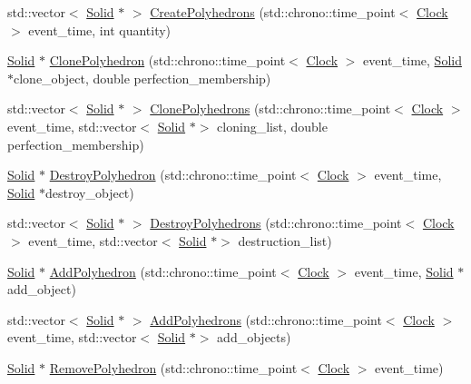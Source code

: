 \begin{DoxyCompactItemize}
std\+::vector$<$ \hyperlink{class_solid}{Solid} $\ast$ $>$ \hyperlink{class_solid_a40b2ea07e384aff138ba139c3c84f525}{Create\+Polyhedrons} (std\+::chrono\+::time\+\_\+point$<$ \hyperlink{universe_8h_a0ef8d951d1ca5ab3cfaf7ab4c7a6fd80}{Clock} $>$ event\+\_\+time, int quantity)
\item 
\hyperlink{class_solid}{Solid} $\ast$ \hyperlink{class_solid_ae83094e9c002a7574db242ed0bff6288}{Clone\+Polyhedron} (std\+::chrono\+::time\+\_\+point$<$ \hyperlink{universe_8h_a0ef8d951d1ca5ab3cfaf7ab4c7a6fd80}{Clock} $>$ event\+\_\+time, \hyperlink{class_solid}{Solid} $\ast$clone\+\_\+object, double perfection\+\_\+membership)
\item 
std\+::vector$<$ \hyperlink{class_solid}{Solid} $\ast$ $>$ \hyperlink{class_solid_a1e650b6d8437acfaf7b9384b885d77bf}{Clone\+Polyhedrons} (std\+::chrono\+::time\+\_\+point$<$ \hyperlink{universe_8h_a0ef8d951d1ca5ab3cfaf7ab4c7a6fd80}{Clock} $>$ event\+\_\+time, std\+::vector$<$ \hyperlink{class_solid}{Solid} $\ast$$>$ cloning\+\_\+list, double perfection\+\_\+membership)
\item 
\hyperlink{class_solid}{Solid} $\ast$ \hyperlink{class_solid_a0841900d8ef4b82292ac027c4852b59b}{Destroy\+Polyhedron} (std\+::chrono\+::time\+\_\+point$<$ \hyperlink{universe_8h_a0ef8d951d1ca5ab3cfaf7ab4c7a6fd80}{Clock} $>$ event\+\_\+time, \hyperlink{class_solid}{Solid} $\ast$destroy\+\_\+object)
\item 
std\+::vector$<$ \hyperlink{class_solid}{Solid} $\ast$ $>$ \hyperlink{class_solid_ab1652ee511ed51bbe6a0a3b1854b7974}{Destroy\+Polyhedrons} (std\+::chrono\+::time\+\_\+point$<$ \hyperlink{universe_8h_a0ef8d951d1ca5ab3cfaf7ab4c7a6fd80}{Clock} $>$ event\+\_\+time, std\+::vector$<$ \hyperlink{class_solid}{Solid} $\ast$$>$ destruction\+\_\+list)
\item 
\hyperlink{class_solid}{Solid} $\ast$ \hyperlink{class_solid_a87a3b588f931ff20f09a5d46f6cb7907}{Add\+Polyhedron} (std\+::chrono\+::time\+\_\+point$<$ \hyperlink{universe_8h_a0ef8d951d1ca5ab3cfaf7ab4c7a6fd80}{Clock} $>$ event\+\_\+time, \hyperlink{class_solid}{Solid} $\ast$add\+\_\+object)
\item 
std\+::vector$<$ \hyperlink{class_solid}{Solid} $\ast$ $>$ \hyperlink{class_solid_a649ba1103a9889bc9e45256633dc72c3}{Add\+Polyhedrons} (std\+::chrono\+::time\+\_\+point$<$ \hyperlink{universe_8h_a0ef8d951d1ca5ab3cfaf7ab4c7a6fd80}{Clock} $>$ event\+\_\+time, std\+::vector$<$ \hyperlink{class_solid}{Solid} $\ast$$>$ add\+\_\+objects)
\item 
\hyperlink{class_solid}{Solid} $\ast$ \hyperlink{class_solid_a1233a3fe43abca7d2a0f83d724fd6640}{Remove\+Polyhedron} (std\+::chrono\+::time\+\_\+point$<$ \hyperlink{universe_8h_a0ef8d951d1ca5ab3cfaf7ab4c7a6fd80}{Clock} $>$ event\+\_\+time)
$$
\end{DoxyCompactItemize}
